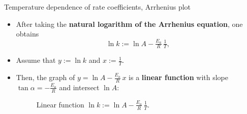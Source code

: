 \begin{frame}{Temperature dependence of rate coefficients, Arrhenius plot}
	\begin{itemize}
		\item After taking the {\bf natural logarithm of the Arrhenius equation}, one obtains
		\[
		\ln k := \ln A - \tfrac{E_a}{R} \, \tfrac{1}{T},
		\]
		\item Assume that $y:=\ln k$ and $	x:=\tfrac{1}{T}$. 
		\item Then, the  graph of $y = \ln A - \tfrac{E_a}{R} \, x$ is a \alert{\bf linear function}
		with slope $\tan \alpha = - \tfrac{E_a}{R}$ and intersect $ \ln A$:
		  \begin{figure}
	  	  \caption{Linear function $\ln k := \ln A - \tfrac{E_a}{R} \, \tfrac{1}{T}$.}
		  \end{figure}

	\end{itemize}
\end{frame}
%
%
